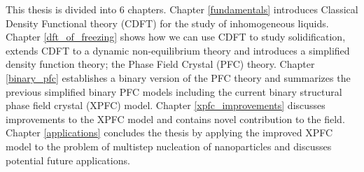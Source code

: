 \label{chapter:introduction}












This thesis is divided into 6 chapters. Chapter \ref{fundamentals} introduces
Classical Density Functional theory (CDFT) for the study of inhomogeneous
liquids. Chapter \ref{dft_of_freezing} shows how we can use CDFT to study
solidification, extends CDFT to a dynamic non-equilibrium theory and introduces
a simplified density function theory; the Phase Field Crystal (PFC) theory.
Chapter \ref{binary_pfc} establishes a binary version of the PFC theory and
summarizes the previous simplified binary PFC models including the current
binary structural phase field crystal (XPFC) model. Chapter
\ref{xpfc_improvements} discusses improvements to the XPFC model and contains
novel contribution to the field. Chapter \ref{applications} concludes the
thesis by applying the improved XPFC model to the problem of multistep
nucleation of nanoparticles and discusses potential future applications.
